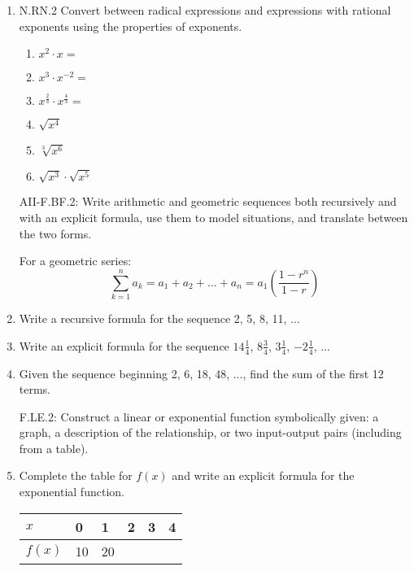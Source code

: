 \documentclass[12pt, twoside]{article}
\begin{document}
\begin{enumerate}[itemsep=0.5cm]
\item N.RN.2 Convert between radical expressions and expressions with rational exponents using the properties of exponents.
    \begin{multicols}{2}
    \begin{enumerate}[itemsep=0.5cm]
        \item $x^2 \cdot x =$
        \item $x^3 \cdot x^{-2} =$
        \item $\displaystyle x^{\frac{2}{3}} \cdot x^{\frac{4}{3}} =$
        \item $\sqrt{x^4}$
        \item $\sqrt[3]{x^6}$
        \item $\sqrt{x^3} \cdot \sqrt{x^5}$
    \end{enumerate}
    \end{multicols}

\newpage
AII-F.BF.2: Write arithmetic and geometric sequences both recursively and with an explicit formula, use them to model situations, and translate between the two forms.

For a geometric series:
$$\sum_{k=1}^{n} a_k = a_1 + a_2 + \ldots + a_n = a_1 \left( \frac{1-r^n}{1-r} \right)$$

\item Write a recursive formula for the sequence 2, 5, 8, 11, $\ldots$ \vspace{3cm}

\item Write an explicit formula for the sequence $14 \frac{1}{4}$, $8 \frac{3}{4}$, $3 \frac{1}{4}$, $-2 \frac{1}{4}$, $\ldots$ \vspace{3cm}


\item Given the sequence beginning  2, 6, 18, 48, $\ldots$, find the sum of the first 12 terms. \vspace{3cm}

F.LE.2: Construct a linear or exponential function symbolically given: a graph, a description of the relationship, or two input-output pairs (including from a table).
\item Complete the table for $f(x)$ and write an explicit formula for the exponential function.
    \begin{center}
    \begin{tabular}{|p{1cm}|p{1cm}|p{1cm}|p{1cm}|p{1cm}|p{1cm}|}
        \hline
        $x$ & 0 & 1 & 2 & 3 & 4 \\
        \hline
        $f(x)$ & 10 & 20 & & & \\[0.25cm]
        \hline
    \end{tabular}
    \end{center}


\end{enumerate}
\end{document}
